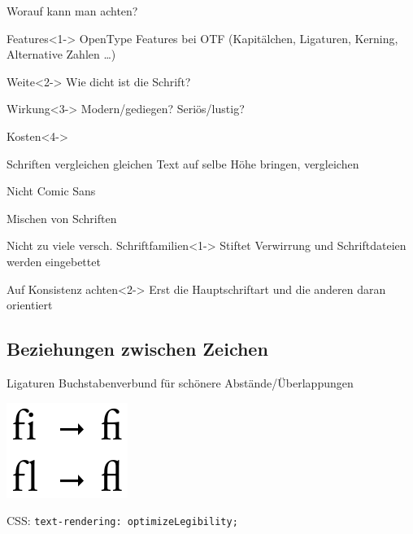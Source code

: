 \documentclass[ngerman,draft, usepdftitle=true]{beamer}
\newcommand*{\code}[1]{\texttt{#1}}
\begin{document}
\begin{frame}{Worauf kann man achten?}  
  \begin{block}{Features}<1->
    OpenType Features bei OTF
    (Kapitälchen, Ligaturen, Kerning, Alternative Zahlen …)
  \end{block}
  \begin{block}{Weite}<2->
    Wie dicht ist die Schrift?
  \end{block}
  \begin{block}{Wirkung}<3->
    Modern/gediegen? Seriös/lustig?
  \end{block}
  \begin{block}{Kosten}<4->\end{block}
\end{frame}

\begin{frame}{Schriften vergleichen}
  gleichen Text auf selbe Höhe bringen, vergleichen
  
  \alert{Nicht Comic Sans}

\end{frame}

\begin{frame}{Mischen von Schriften}
  \begin{alertblock}{Nicht zu viele versch. Schriftfamilien}<1->
    Stiftet Verwirrung und Schriftdateien werden eingebettet
  \end{alertblock}
  \begin{alertblock}{Auf Konsistenz achten}<2->
    Erst die Hauptschriftart und die anderen daran orientiert
  \end{alertblock}
\end{frame}


\subsection{Beziehungen zwischen Zeichen}
\begin{frame}{Ligaturen}
Buchstabenverbund für schönere Abstände/Überlappungen
\begin{center}
  \includegraphics[height=.2\paperheight]{Ligatures.png}
\end{center}
\vfill
CSS: \code{text-rendering: optimizeLegibility;}
\end{frame}
\end{document}
